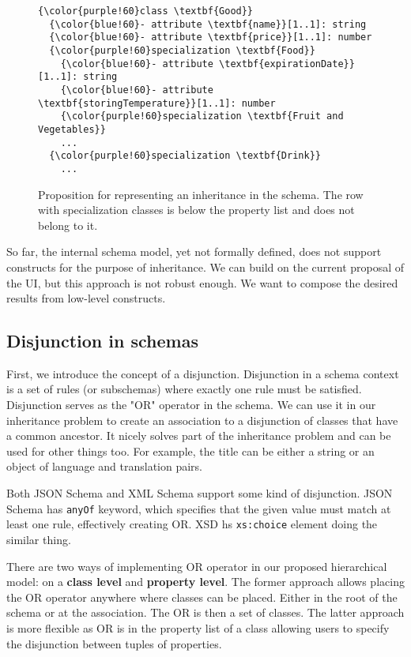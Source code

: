 \begin{figure}[h!]\centering
  \begin{Verbatim}[commandchars=\\\{\}]
{\color{purple!60}class \textbf{Good}}
  {\color{blue!60}- attribute \textbf{name}}[1..1]: string
  {\color{blue!60}- attribute \textbf{price}}[1..1]: number
  {\color{purple!60}specialization \textbf{Food}}
    {\color{blue!60}- attribute \textbf{expirationDate}}[1..1]: string
    {\color{blue!60}- attribute \textbf{storingTemperature}}[1..1]: number
    {\color{purple!60}specialization \textbf{Fruit and Vegetables}}
    ...
  {\color{purple!60}specialization \textbf{Drink}}
    ...
\end{Verbatim}
  \caption{Proposition for representing an inheritance in the schema. The row with specialization classes is below the property list and does not belong to it.}
\end{figure}

So far, the internal schema model, yet not formally defined, does not support constructs for the purpose of inheritance. We can build on the current proposal of the UI, but this approach is not robust enough. We want to compose the desired results from low-level constructs.

\subsection{Disjunction in schemas}

First, we introduce the concept of a disjunction. Disjunction in a schema context is a set of rules (or subschemas) where exactly one rule must be satisfied. Disjunction serves as the "OR" operator in the schema. We can use it in our inheritance problem to create an association to a disjunction of classes that have a common ancestor. It nicely solves part of the inheritance problem and can be used for other things too. For example, the title can be either a string or an object of language and translation pairs.

Both JSON Schema and XML Schema support some kind of disjunction. JSON Schema has {\tt anyOf} keyword, which specifies that the given value must match at least one rule, effectively creating OR. XSD hs {\tt xs:choice} element doing the similar thing.

There are two ways of implementing OR operator in our proposed hierarchical model: on a \textbf{class level} and \textbf{property level}. The former approach allows placing the OR operator anywhere where classes can be placed. Either in the root of the schema or at the association. The OR is then a set of classes. The latter approach is more flexible as OR is in the property list of a class allowing users to specify the disjunction between tuples of properties.

